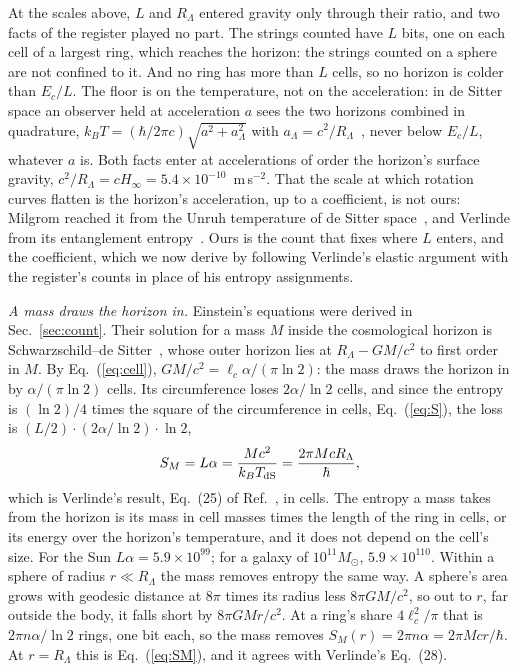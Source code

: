 \documentclass[aps,prd,twocolumn,superscriptaddress,nofootinbib,showkeys]{revtex4-2}
\makeatletter
\newcommand{\lc}{\ell_c}
\newcommand{\Ec}{E_c}
\newcommand{\RL}{R_\Lambda}
\def\subsection{\@startsection{subsection}{2}{\z@}{0.6cm \@plus1ex \@minus .2ex}{0.35cm}{\normalfont\small\bfseries}}
\makeatother
\begin{document}
\subsection{Galactic scale: the string}\label{sec:galactic}

At the scales above, $L$ and $\RL$ entered gravity only through their ratio, and two facts of the register played no part. The strings counted have $L$ bits, one on each cell of a largest ring, which reaches the horizon: the strings counted on a sphere are not confined to it. And no ring has more than $L$ cells, so no horizon is colder than $\Ec/L$. The floor is on the temperature, not on the acceleration: in de Sitter space an observer held at acceleration $a$ sees the two horizons combined in quadrature, $k_BT = (\hbar/2\pi c)\sqrt{a^2 + a_\Lambda^2}$ with $a_\Lambda = c^2/\RL$~\cite{deser1997}, never below $\Ec/L$, whatever $a$ is. Both facts enter at accelerations of order the horizon's surface gravity, $c^2/\RL = cH_\infty = 5.4\times10^{-10}$~m\,s$^{-2}$. That the scale at which rotation curves flatten is the horizon's acceleration, up to a coefficient, is not ours: Milgrom reached it from the Unruh temperature of de Sitter space~\cite{milgrom1999}, and Verlinde from its entanglement entropy~\cite{verlinde2017}. Ours is the count that fixes where $L$ enters, and the coefficient, which we now derive by following Verlinde's elastic argument with the register's counts in place of his entropy assignments.

\textit{A mass draws the horizon in.} Einstein's equations were derived in Sec.~\ref{sec:count}. Their solution for a mass $M$ inside the cosmological horizon is Schwarzschild--de Sitter~\cite{kottler1918}, whose outer horizon lies at $\RL - GM/c^2$ to first order in $M$. By Eq.~(\ref{eq:cell}), $GM/c^2 = \lc\alpha/(\pi\ln2)$: the mass draws the horizon in by $\alpha/(\pi\ln2)$ cells. Its circumference loses $2\alpha/\ln2$ cells, and since the entropy is $(\ln2)/4$ times the square of the circumference in cells, Eq.~(\ref{eq:S}), the loss is $(L/2)\cdot(2\alpha/\ln2)\cdot\ln2$,
\begin{equation}
S_M = L\alpha = \frac{Mc^2}{k_BT_{\rm dS}} = \frac{2\pi Mc\RL}{\hbar} ,
\label{eq:SM}
\end{equation}
which is Verlinde's result, Eq.~(25) of Ref.~\cite{verlinde2017}, in cells. The entropy a mass takes from the horizon is its mass in cell masses times the length of the ring in cells, or its energy over the horizon's temperature, and it does not depend on the cell's size. For the Sun $L\alpha = 5.9\times10^{99}$; for a galaxy of $10^{11}M_\odot$, $5.9\times10^{110}$. Within a sphere of radius $r\ll\RL$ the mass removes entropy the same way. A sphere's area grows with geodesic distance at $8\pi$ times its radius less $8\pi GM/c^2$, so out to $r$, far outside the body, it falls short by $8\pi GMr/c^2$. At a ring's share $4\lc^2/\pi$ that is $2\pi n\alpha/\ln2$ rings, one bit each, so the mass removes $S_M(r) = 2\pi n\alpha = 2\pi Mcr/\hbar$. At $r = \RL$ this is Eq.~(\ref{eq:SM}), and it agrees with Verlinde's Eq.~(28).
\end{document}
